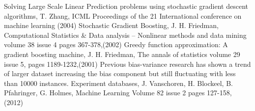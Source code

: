 \documentclass[a4paper,10pt]{article}
\begin{document}
\begin{thebibliography}{9}
 Solving Large Scale Linear Prediction problems using stochastic gradient descent algorithms, T. Zhang, ICML Proceedings of the 21 International conference on machine learning (2004)
 Stochastic Gradient Boosting, J. H. Friedman,  Computational Statistics \& Data analysis – Nonlinear methods and data mining volume 38 issue 4 pages 367-378,(2002)
 Greedy function approximation: A gradient boosting machine, J. H. Friedman, The annals of statistics volume 29 issue 5, pages 1189-1232,(2001)
Previous bias-variance research has shown a trend of larger dataset increasing the bias component but still fluctuating with  less than 10000 instances.
 Experiment databases, J. Vanschoren, H. Blockeel, B. Pfahringer, G. Holmes, Machine Learning Volume 82 issue 2 pages 127-158, (2012)

 
     
\end{thebibliography}
\endgroup
\end{document}
